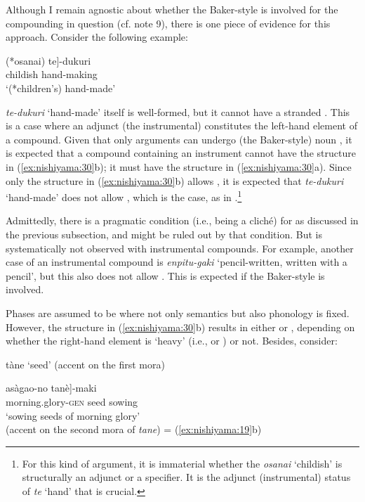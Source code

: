 \documentclass[output=paper]{LSP/langsci}
\begin{document}
Although I remain agnostic about whether the Baker-style  is involved for the compounding in question (cf. note 9), there is one piece of evidence for this approach. Consider the following example:

\ea\label{ex:nishiyama:31}
\gll {\ob}(*osanai) te]-dukuri\\
      {\db}{\db}{\db}childish hand-making  \\
\glt ‘(*children’s) hand-made’           \citep[220]{Sugioka2005}
\z

\textit{te-dukuri} ‘hand-made’ itself is well-formed, but it cannot have a stranded . This is a case where an adjunct (the instrumental) constitutes the left-hand element of a compound. Given that only arguments can undergo (the Baker-style) noun , it is expected that a compound containing an instrument cannot have the structure in (\ref{ex:nishiyama:30}b); it must have the structure in (\ref{ex:nishiyama:30}a). Since only the structure in (\ref{ex:nishiyama:30}b) allows  , it is expected that \textit{te-dukuri} ‘hand-made’ does not allow  , which is the case, as in .\footnote{For this kind of argument, it is immaterial whether the  \textit{osanai} ‘childish’ is structurally an adjunct or a specifier. It is the adjunct (instrumental) status of \textit{te} ‘hand’ that is crucial.}

Admittedly, there is a pragmatic condition (i.e., being a cliché) for   as discussed in the previous subsection, and  might be ruled out by that condition. But   is systematically not observed with instrumental compounds. For example, another case of an instrumental compound is \textit{enpitu-gaki} ‘pencil-written, written with a pencil’, but this also does not allow  . This is expected if the Baker-style  is involved.

Phases are assumed to be where not only semantics but also phonology is fixed. However, the structure in (\ref{ex:nishiyama:30}b) results in either  or , depending on whether the right-hand element is ‘heavy’ (i.e.,  or ) or not. Besides, consider:

\ea\label{ex:nishiyama:32}
 \ea  tàne ‘seed’ (accent on the first mora)

  \ex
\gll {\ob}asàgao-no       tanè]-maki \\
morning.glory-\textsc{gen} {seed sowing}\\
\glt ‘sowing seeds of morning glory’\\
\glend (accent on the second mora of \textit{tane})  = (\ref{ex:nishiyama:19}b)\\
\z \z
\end{document}

